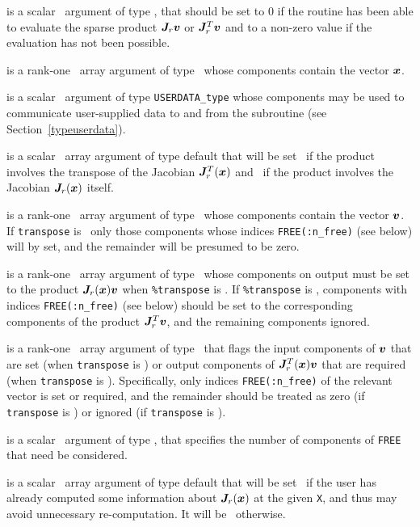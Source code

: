 \documentclass{galahad}
\begin{document}
\begin{description}
 is a scalar \intentout\ argument of type \integer,
that should be set to 0 if the routine has been able to evaluate the
sparse product ${\bm{J}}_r {\bm{v}}$ or ${\bm{J}}_r^T{\bm{v}}$
and to a non-zero value if the evaluation has not been possible.

 is a rank-one \intentin\ array argument of type \realdp\
whose components contain the vector ${\bm{x}}$.

 is a scalar \intentinout\ argument of type
{\tt USERDATA\_type} whose components may be used
to communicate user-supplied data to and from the subroutine
(see Section~\ref{typeuserdata}).

 is a scalar \intentin\ array argument of type
default that will be set \true\ if the product involves the transpose
of the Jacobian ${\bm{J}}_r^T({\bm{x}})$ and \false\ if the product involves
the Jacobian ${\bm{J}}_r({\bm{x}})$ itself.

 is a rank-one \intentin\ array argument of type \realdp\
whose components contain the vector ${\bm{v}}$. If {\tt transpose} is \false\
only those components whose indices {\tt FREE(:n\_free)} (see below)
will by set, and the remainder will be presumed to be zero.

\ittf{P} is a rank-one \intentout\ array argument of type \realdp\
whose components on output must be set to the
product ${\bm{J}}_r({\bm{x}}) {\bm{v}}$ when {\tt \%transpose} is \false. If
{\tt \%transpose} is \true, components with indices {\tt FREE(:n\_free)}
(see below) should be set to the corresponding components of the
product ${\bm{J}}_r^T {\bm{v}}$, and the remaining components ignored.

\itt{FREE} is a rank-one \intentin\ array argument of
type \integer\ that flags the input components of ${\bm{v}}$ that are set
(when {\tt transpose} is \false) or output components of ${\bm{J}}_r^T({\bm{x}}) {\bm{v}}$ 
that are required (when {\tt transpose} is \true). Specifically, only indices
{\tt FREE(:n\_free)} of the relevant vector is set or required, and the
remainder should be treated as zero (if {\tt transpose} is \false)
or ignored  (if {\tt transpose} is \true).

\itt{n\_free} is a scalar \intentin\ argument of type \integer,
that specifies the number of components of {\tt FREE} that need be considered.

 is a scalar \intentin\ array argument of type
default that will be set \true\ if the user has already computed
some information about ${\bm{J}}_r({\bm{x}})$ at the given {\tt X}, and thus
may avoid unnecessary re-computation. It will be \false\ otherwise.

\end{description}
\end{document}

